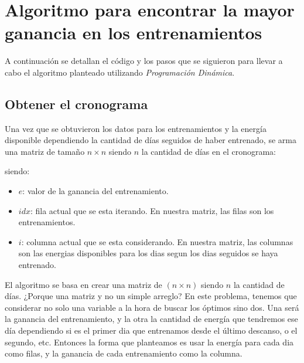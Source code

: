 \section{Algoritmo para encontrar la mayor ganancia en los entrenamientos}

A continuación se detallan el código y los pasos que se siguieron para llevar a cabo el algoritmo planteado utilizando \textit{Programación Dinámica}.

\subsection{Obtener el cronograma}

Una vez que se obtuvieron los datos para los entrenamientos y la energía disponible dependiendo la cantidad de días seguidos de haber entrenado, se arma una matriz de tamaño $n \times n$ siendo $n$ la cantidad de días en el cronograma:



siendo:
\begin{itemize}
    \item $e$: valor de la ganancia del entrenamiento.
    \item $idx$: fila actual que se esta iterando. En nuestra matriz, las filas son los entrenamientos.
    \item $i$: columna actual que se esta considerando. En nuestra matriz, las columnas son las energias disponibles para los dias segun los dias seguidos se haya entrenado.
\end{itemize}

El algoritmo se basa en crear una matriz de $(n \times n)$ siendo $n$ la cantidad de días. ¿Porque una matriz y no un simple arreglo? En este problema, tenemos que considerar no solo una variable a la hora de buscar los óptimos sino dos. Una será la ganancia del entrenamiento, y la otra la cantidad de energía que tendremos ese día dependiendo si es el primer dia que entrenamos desde el último descanso, o el segundo, etc. Entonces la forma que planteamos es usar la energía para cada dia como filas, y la ganancia de cada entrenamiento como la columna.

